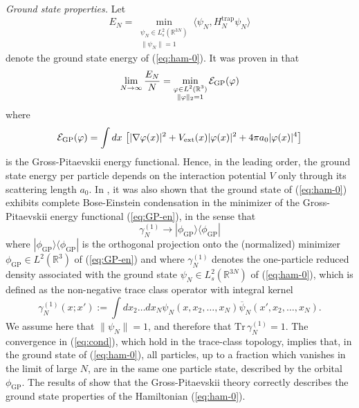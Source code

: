 \documentclass[11pt,a4paper]{article}
\newcommand{\bR}{{\mathbb R}}
\newcommand{\tr}{\mbox{Tr}}
\newcommand{\cE}{{\cal E}}
\begin{document}
{\it Ground state properties.} Let \[ E_N = \min_{\substack{\psi_N \in L^2_s (\bR^{3N}) \\ \| \psi_N \| = 1}} \langle \psi_N , H^{\text{trap}}_N \psi_N \rangle \]
denote the ground state energy of (\ref{eq:ham-0}). It was proven in \cite{LSY} that
\[ \lim_{N \to \infty} \frac{E_N}{N} = \min_{\substack{\varphi \in L^2 (\bR^3) \\ \| \varphi \|_2 = 1}} \cE_{\text{GP}} (\varphi) \]
where 
\begin{equation}\label{eq:GP-en} \cE_{\text{GP}} (\varphi) = \int dx \, \left[ |\nabla \varphi (x)|^2 + V_{\text{ext}} (x) |\varphi (x)|^2 + 4 \pi a_0 |\varphi (x)|^4 \right] \end{equation}
is the Gross-Pitaevskii energy functional. Hence, in the leading order, the ground state energy per particle depends on the interaction potential $V$ only through its scattering length $a_0$. In \cite{LS}, it was also shown that the ground state of (\ref{eq:ham-0}) exhibits complete Bose-Einstein condensation in the minimizer of the Gross-Pitaevskii energy functional (\ref{eq:GP-en}),
in the sense that 
\begin{equation}\label{eq:cond} \gamma_N^{(1)} \to | \phi_{\text{GP}} \rangle \langle \phi_{\text{GP}}| \end{equation}
where $|\phi_{\text{GP}} \rangle \langle \phi_{\text{GP}} |$ is the orthogonal projection onto the (normalized) 
minimizer $\phi_{\text{GP}} \in L^2 (\bR^3)$ of (\ref{eq:GP-en}) and where $\gamma^{(1)}_N$ denotes the one-particle reduced density associated with the ground state $\psi_N \in L^2_s (\bR^{3N})$ of (\ref{eq:ham-0}), which is defined as the non-negative trace class operator with integral kernel
\begin{equation}\label{eq:one-red} \gamma^{(1)}_N (x;x') := \int dx_2 \dots dx_N \psi_N (x , x_2, \dots  ,x_N) \overline{\psi}_N (x' , x_2 , \dots , x_N). \end{equation}
We assume here that $\| \psi_N \|  =1$, and therefore that $\tr \, \gamma^{(1)}_N = 1$. The convergence in (\ref{eq:cond}), which hold in the trace-class topology, implies that, in the ground state of (\ref{eq:ham-0}), all particles, up to a fraction which vanishes in the limit of large $N$, are in the same one particle state, described by the orbital $\phi_{\text{GP}}$. The results of \cite{LSY,LS} show that the Gross-Pitaevskii theory correctly describes the ground state properties of the Hamiltonian (\ref{eq:ham-0}). 

\bigskip
\end{document}
